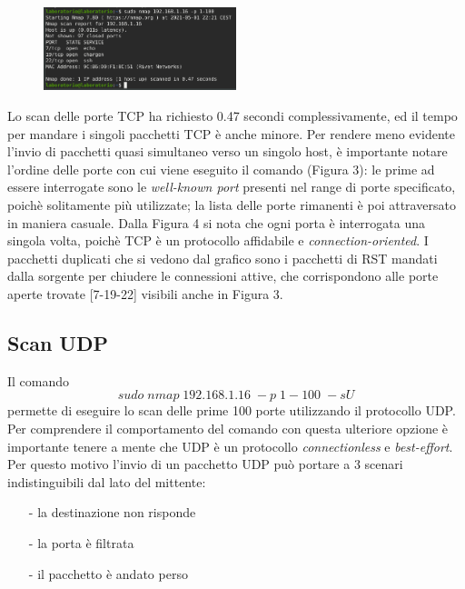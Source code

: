 \documentclass{article}
\begin{document}
\begin{figure} %
  \centering
  \includegraphics[width=0.5\textwidth]{servizi attivi su vm.png}
  \vspace{-10pt}
\end{figure}%
\pagebreak
Lo scan delle porte TCP ha richiesto 0.47 secondi complessivamente, ed il tempo
per mandare i singoli pacchetti TCP è anche minore. Per rendere meno evidente 
l'invio di pacchetti quasi simultaneo verso un singolo host, è importante
notare l'ordine delle porte con cui viene eseguito il comando (Figura 3):
le prime ad essere interrogate sono le \textit{well-known port} presenti nel range di porte specificato,
 poichè solitamente più utilizzate; la lista delle porte rimanenti è poi attraversato
 in maniera casuale. Dalla Figura 4 si nota che ogni porta è interrogata una singola volta, poichè TCP 
 è un protocollo affidabile e \textit{connection-oriented}. I pacchetti duplicati che si vedono dal grafico sono 
 i pacchetti di RST mandati dalla sorgente per chiudere le connessioni attive, che corrispondono alle porte 
 aperte trovate [7-19-22] visibili anche in Figura 3. 

 \subsection{Scan UDP}
 Il comando $$sudo\; nmap \;192.168.1.16\; -p \; 1-100 \; -sU$$ permette di eseguire lo scan delle prime 100 porte 
 utilizzando il protocollo UDP. Per comprendere il comportamento del comando con questa
 ulteriore opzione è importante tenere a mente che UDP è un protocollo \textit{connectionless}
 e \textit{best-effort}. Per questo motivo l'invio di un pacchetto UDP può portare a 3 scenari indistinguibili 
 dal lato del mittente:
 \begin{itemize}
  \item[-] la destinazione non risponde
  \vspace{-5pt} 
  \item[-] la porta è filtrata
  \vspace{-5pt}
  \item[-] il pacchetto è andato perso
\end{itemize}
\end{document}
